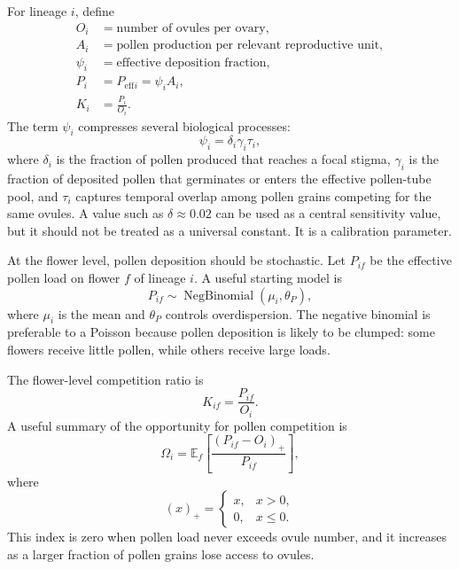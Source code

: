 \documentclass[11pt]{article}
\newcommand{\Peff}{P_{\mathrm{eff}}}
\newcommand{\E}{\mathbb{E}}
\begin{document}
For lineage \(i\), define
\begin{align}
O_i &= \text{number of ovules per ovary}, \\
A_i &= \text{pollen production per relevant reproductive unit}, \\
\psi_i &= \text{effective deposition fraction}, \\
P_i &= \Peff{}_{i} = \psi_i A_i, \\
K_i &= \frac{P_i}{O_i}.
\end{align}
The term \(\psi_i\) compresses several biological processes:
\begin{equation}
\psi_i = \delta_i\gamma_i\tau_i,
\label{eq:psi}
\end{equation}
where \(\delta_i\) is the fraction of pollen produced that reaches a focal stigma, \(\gamma_i\) is the fraction of deposited pollen that germinates or enters the effective pollen-tube pool, and \(\tau_i\) captures temporal overlap among pollen grains competing for the same ovules. A value such as \(\delta \approx 0.02\) can be used as a central sensitivity value, but it should not be treated as a universal constant. It is a calibration parameter.

At the flower level, pollen deposition should be stochastic. Let \(P_{if}\) be the effective pollen load on flower \(f\) of lineage \(i\). A useful starting model is
\begin{equation}
P_{if} \sim \operatorname{NegBinomial}(\mu_i,\theta_P),
\label{eq:nb_pollen}
\end{equation}
where \(\mu_i\) is the mean and \(\theta_P\) controls overdispersion. The negative binomial is preferable to a Poisson because pollen deposition is likely to be clumped: some flowers receive little pollen, while others receive large loads.

The flower-level competition ratio is
\begin{equation}
K_{if} = \frac{P_{if}}{O_i}.
\end{equation}
A useful summary of the opportunity for pollen competition is
\begin{equation}
\Omega_i = \E_f\left[\frac{(P_{if}-O_i)_+}{P_{if}}\right],
\label{eq:omega}
\end{equation}
where
\begin{equation}
(x)_+ = 
\begin{cases}
x, & x>0, \\
0, & x\leq 0.
\end{cases}
\end{equation}
This index is zero when pollen load never exceeds ovule number, and it increases as a larger fraction of pollen grains lose access to ovules.
\end{document}
